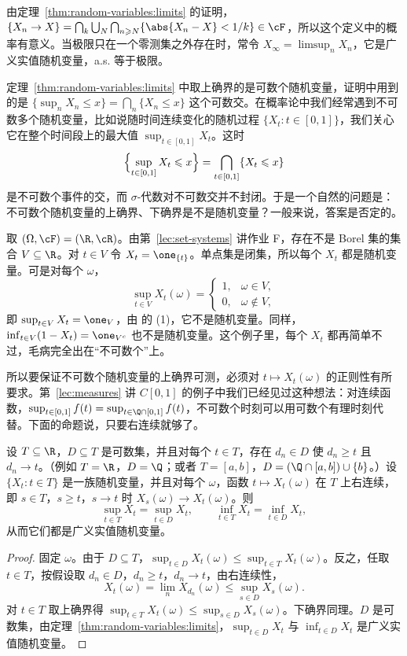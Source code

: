 由定理~\ref{thm:random-variables:limits} 的证明，$\{X_n\to X\}=\bigcap_{k}\bigcup_N\bigcap_{n\geqslant N}\{\abs{X_n-X}<1/k\}\in\cF$，所以这个定义中的概率有意义。当极限只在一个零测集之外存在时，常令 $X_\infty=\limsup_nX_n$，它是广义实值随机变量，a.s. 等于极限。


定理~\ref{thm:random-variables:limits} 中取上确界的是可数个随机变量，证明中用到的是 $\{\sup_nX_n\leqslant x\}=\bigcap_n\{X_n\leqslant x\}$ 这个可数交。在概率论中我们经常遇到不可数多个随机变量，比如说随时间连续变化的随机过程 $\{X_t:t\in[0,1]\}$，我们关心它在整个时间段上的最大值 $\sup_{t\in[0,1]}X_t$。这时
\[
\Bigl\{\sup_{t\in[0,1]}X_t\leqslant x\Bigr\}=\bigcap_{t\in[0,1]}\{X_t\leqslant x\}
\]
是不可数个事件的交，而 $\sigma$-代数对不可数交并不封闭。于是一个自然的问题是：不可数个随机变量的上确界、下确界是不是随机变量？一般来说，答案是否定的。

\begin{example}[不可数个随机变量的上确界可以不可测]
取 $(\Omega,\cF)=(\R,\cR)$。由第~\ref{lec:set-systems} 讲作业 F，存在不是 Borel 集的集合 $V\subseteq\R$。对 $t\in V$ 令 $X_t=\one_{\{t\}}$。单点集是闭集，所以每个 $X_t$ 都是随机变量。可是对每个 $\omega$，
\[
\sup_{t\in V}X_t(\omega)=\begin{cases}1,&\omega\in V,\\0,&\omega\notin V,\end{cases}
\]
即 $\sup_{t\in V}X_t=\one_V$，由 的 (1)，它不是随机变量。同样，$\inf_{t\in V}(1-X_t)=\one_{V^c}$ 也不是随机变量。这个例子里，每个 $X_t$ 都再简单不过，毛病完全出在“不可数个”上。
\end{example}

所以要保证不可数个随机变量的上确界可测，必须对 $t\mapsto X_t(\omega)$ 的正则性有所要求。第~\ref{lec:measures} 讲 $C[0,1]$ 的例子中我们已经见过这种想法：对连续函数，$\sup_{t\in[0,1]}f(t)=\sup_{t\in\Q\cap[0,1]}f(t)$，不可数个时刻可以用可数个有理时刻代替。下面的命题说，只要右连续就够了。

\begin{proposition}[右连续时化为可数个]\label{prop:random-variables:sup-right-continuous}
设 $T\subseteq\R$，$D\subseteq T$ 是可数集，并且对每个 $t\in T$，存在 $d_n\in D$ 使 $d_n\geqslant t$ 且 $d_n\to t$。（例如 $T=\R$，$D=\Q$；或者 $T=[a,b]$，$D=(\Q\cap[a,b])\cup\{b\}$。）设 $\{X_t:t\in T\}$ 是一族随机变量，并且对每个 $\omega$，函数 $t\mapsto X_t(\omega)$ 在 $T$ 上右连续，即 $s\in T$，$s\geqslant t$，$s\to t$ 时 $X_s(\omega)\to X_t(\omega)$。则
\[
\sup_{t\in T}X_t=\sup_{t\in D}X_t,\qquad \inf_{t\in T}X_t=\inf_{t\in D}X_t,
\]
从而它们都是广义实值随机变量。
\end{proposition}
\begin{proof}
固定 $\omega$。由于 $D\subseteq T$，$\sup_{t\in D}X_t(\omega)\leqslant\sup_{t\in T}X_t(\omega)$。反之，任取 $t\in T$，按假设取 $d_n\in D$，$d_n\geqslant t$，$d_n\to t$，由右连续性，
\[
X_t(\omega)=\lim_nX_{d_n}(\omega)\leqslant\sup_{s\in D}X_s(\omega).
\]
对 $t\in T$ 取上确界得 $\sup_{t\in T}X_t(\omega)\leqslant\sup_{s\in D}X_s(\omega)$。下确界同理。$D$ 是可数集，由定理~\ref{thm:random-variables:limits}，$\sup_{t\in D}X_t$ 与 $\inf_{t\in D}X_t$ 是广义实值随机变量。
\end{proof}

